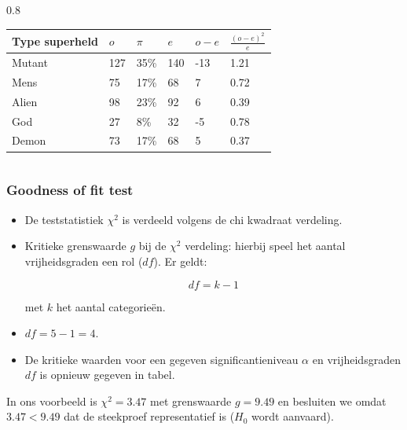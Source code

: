 \documentclass{beamer}
\begin{document}
\begin{frame}
\begin{columns}
    \begin{column} { 0.8 \textwidth}
\begin{table}[h]
\begin{tabular}{@{}llllll@{}}
\toprule
\textbf{Type superheld} & \textbf{$o$} & \textbf{$\pi$} & \textbf{$e$} & \textbf{$o -e$} & \textbf{$\frac{(o-e)^{2}}{e}$} \\ \midrule
Mutant                  & 127          & 35\%           & 140          & -13             & 1.21                           \\
Mens                    & 75           & 17\%           & 68           & 7               & 0.72                           \\
Alien                   & 98           & 23\%           & 92           & 6               & 0.39                           \\
God                     & 27           & 8\%            & 32           & -5              & 0.78                           \\
Demon                   & 73           & 17\%           & 68           & 5               & 0.37                           \\ \bottomrule
\end{tabular}
\end{table}
    \end{column}
  \end{columns}
\end{frame}


\begin{frame}
  \frametitle{Goodness of fit test}

  \begin{itemize}
    \item De teststatistiek $\chi^{2}$ is verdeeld volgens de chi kwadraat verdeling.
    \item Kritieke grenswaarde $g$ bij de $\chi^{2}$ verdeling: hierbij speel het aantal vrijheidsgraden een rol ($df$). Er geldt:

\[ df = k -1 \]

met $k$ het aantal categorie\"en.
\item $df = 5-1 = 4$.
\item De kritieke waarden voor een gegeven significantieniveau $\alpha$ en vrijheidsgraden $df$ is opnieuw gegeven in tabel.
  \end{itemize}
In ons voorbeeld is $\chi^{2} = 3.47$ met grenswaarde $g = 9.49$ en besluiten we omdat $3.47 < 9.49$ dat de steekproef representatief is ($H_0$ wordt aanvaard).
\end{frame}
\end{document}
